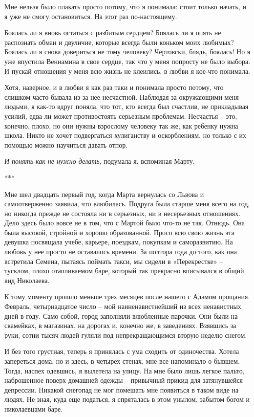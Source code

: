 \documentclass[
]{book}
\begin{document}
Мне нельзя было плакать просто потому, что я понимала: стоит только начать, и я уже не смогу остановиться. На этот раз по-настоящему.

Боялась ли я вновь остаться с разбитым сердцем? Боялась ли я опять не распознать обман и двуличие, которые всегда были коньком моих любимых? Боялась ли я снова довериться не тому человеку? Чертовски, блядь, боялась! Но я уже впустила Вениамина в свое сердце, так что у меня попросту не было выбора. И пускай отношения у меня всю жизнь не клеились, в любви я кое-что понимала.

Хотя, наверное, и в любви я как раз таки и понимала просто потому, что слишком часто бывала из-за нее несчастной. Наблюдая за окружающими меня людьми, я как-то вдруг поняла, что тот, кто всегда был счастлив, не прикладывая усилий, едва ли может противостоять серьезным проблемам. Несчастья -- это, конечно, плохо, но они нужны взрослому человеку так же, как ребенку нужна школа. Никто не хочет подвергаться хулиганству и оскорблениям, но только с их помощью можно научиться давать отпор.

\emph{И понять как не нужно делать}, подумала я, вспоминая Марту.

***

Мне шел двадцать первый год, когда Марта вернулась со Львова и самоотверженно заявила, что влюбилась. Подруга была старше меня всего на год, но никогда прежде не состояла ни в серьезных, ни в несерьезных отношениях. Дело здесь было вовсе не в том, что с Мартой было что-то не так. Отнюдь. Она была высокой, стройной и хорошо образованной. Просо всю свою жизнь эта девушка посвящала учебе, карьере, поездкам, покупкам и саморазвитию. На любовь у нее просто не оставалось времени. За полтора года до того, как она встретила Семена, пытаясь поймать такси, мы сидели в «Перекрестке» -- тусклом, плохо отапливаемом баре, который так прекрасно вписывался в общий вид Николаева.

К тому моменту прошло меньше трех месяцев после нашего с Адамом прощания. Февраль, четырнадцатое число -- мой наиненавистнейший из всех ненавистных дней в году. Само собой, город заполняли влюбленные парочки. Они были на скамейках, в магазинах, на дорогах и, конечно же, в заведениях. Взявшись за руки, сотни тысяч людей гуляли под непрекращающимся вторую неделю снегом.

И без того грустная, теперь я принялась с ума сходить от одиночества. Хотела запереться дома, но и здесь, в четырех стенах, мне все напоминало о бывшем. Тогда, наспех одевшись, я вылетела на улицу. На мне было лишь легкое пальто, наброшенное поверх домашней одежды -- привычный прикид для затянувшейся депрессии. Никакой снегопад не мог помешать мне появиться в таком виде на людях. Не зная, куда еще податься, я спряталась в этом унылом, забытом богом и николаевцами баре.
\end{document}

